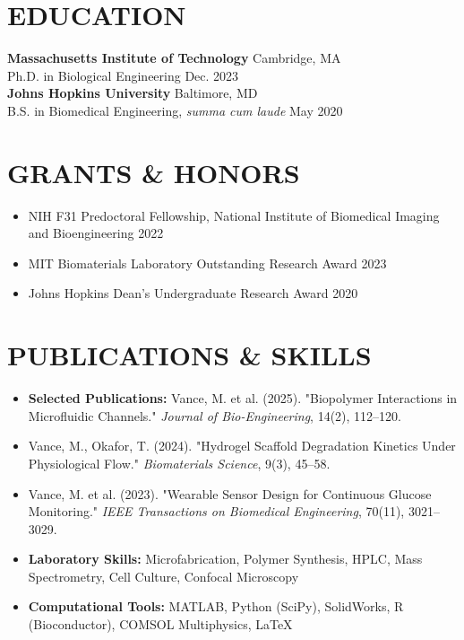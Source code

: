 \documentclass[10pt,letterpaper]{article}
\begin{document}
\section{EDUCATION}

\textbf{Massachusetts Institute of Technology} \hfill Cambridge, MA \\
Ph.D. in Biological Engineering \hfill Dec. 2023 \\
\vspace{4pt}
\textbf{Johns Hopkins University} \hfill Baltimore, MD \\
B.S. in Biomedical Engineering, \textit{summa cum laude} \hfill May 2020

\section{GRANTS \& HONORS}
\begin{itemize}[leftmargin=0.15in, label={}]
    \item NIH F31 Predoctoral Fellowship, National Institute of Biomedical Imaging and Bioengineering \hfill 2022
    \item MIT Biomaterials Laboratory Outstanding Research Award \hfill 2023
    \item Johns Hopkins Dean's Undergraduate Research Award \hfill 2020
\end{itemize}

\section{PUBLICATIONS \& SKILLS}
\begin{itemize}[leftmargin=0.15in, label={}]
    \item \textbf{Selected Publications:} Vance, M. et al. (2025). "Biopolymer Interactions in Microfluidic Channels." \textit{Journal of Bio-Engineering}, 14(2), 112--120.
    \item Vance, M., Okafor, T. (2024). "Hydrogel Scaffold Degradation Kinetics Under Physiological Flow." \textit{Biomaterials Science}, 9(3), 45--58.
    \item Vance, M. et al. (2023). "Wearable Sensor Design for Continuous Glucose Monitoring." \textit{IEEE Transactions on Biomedical Engineering}, 70(11), 3021--3029.
    \item \textbf{Laboratory Skills:} Microfabrication, Polymer Synthesis, HPLC, Mass Spectrometry, Cell Culture, Confocal Microscopy
    \item \textbf{Computational Tools:} MATLAB, Python (SciPy), SolidWorks, R (Bioconductor), COMSOL Multiphysics, \LaTeX
\end{itemize}
\end{document}
